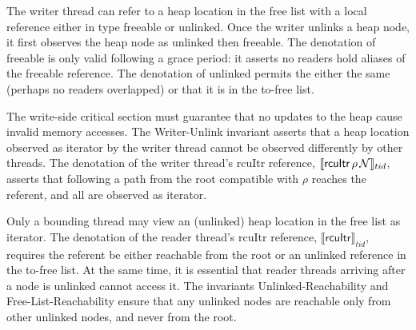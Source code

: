 The writer thread can refer to a heap location in the free list with a local reference either in type \textsf{freeable} or \textsf{unlinked}. Once the writer unlinks a heap node, it first observes the heap node as \textsf{unlinked} then \textsf{freeable}. The denotation of \textsf{freeable} is only valid following a grace period: it asserts no readers hold aliases of the \textsf{freeable} reference. The denotation of \textsf{unlinked} permits the either the same (perhaps no readers overlapped) 
or that it is in the to-free list.

The write-side critical section must guarantee that no updates to the heap cause invalid memory accesses. 
The \textsf{Writer-Unlink} invariant asserts that a heap location observed as \textsf{iterator} by the writer thread cannot be observed differently by other threads. The denotation of the writer thread's \textsf{rcuItr} reference, $\llbracket \mathsf{rcuItr}\,\rho \,\mathcal{N} \rrbracket_{tid}$, asserts that 
following a path from the root compatible with $\rho$ reaches the referent, and all are observed as \textsf{iterator}.

Only a bounding thread may view an (unlinked) heap location in the free list as \textsf{iterator}. The denotation of the reader thread's \textsf{rcuItr} reference, $\llbracket \mathsf{rcuItr} \rrbracket_{tid}$, requires the referent be either reachable from the root or an unlinked reference in the to-free list.
At the same time, it is essential that reader threads arriving after a node is unlinked cannot access it.
The invariants \textsf{Unlinked-Reachability} and \textsf{Free-List-Reachability} ensure that any unlinked nodes are reachable only from other unlinked nodes, and never from the root.
 
